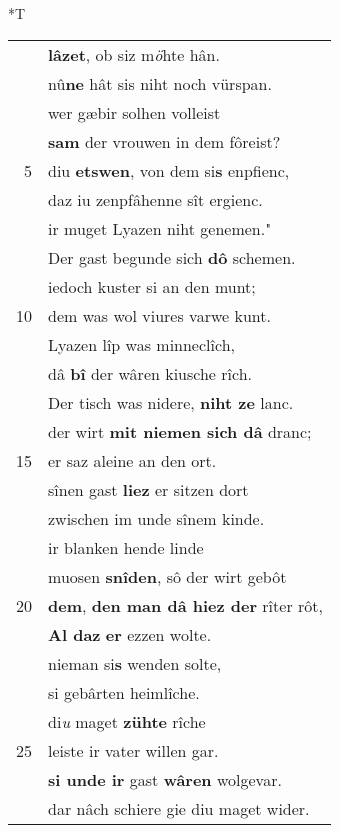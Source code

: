 \documentclass[8pt,a4paper,notitlepage]{article}
\begin{document}
\begin{table}[ht]
\begin{minipage}[t]{0.5\linewidth}
\end{minipage}
\hspace{0.5cm}
\begin{minipage}[t]{0.5\linewidth}
\small
\begin{center}*T
\end{center}
\begin{tabular}{rl}
 & \textbf{lâzet}, ob siz m\textit{ö}hte hân.\\ 
 & nû\textbf{ne} hât sis niht noch vürspan.\\ 
 & wer gæbir solhen volleist\\ 
 & \textbf{sam} der vrouwen in dem fôreist?\\ 
5 & diu  \textbf{etswen}, von dem si\textbf{s} enpfienc,\\ 
 & daz iu zenpfâhenne sît ergienc.\\ 
 & ir muget Lyazen niht genemen."\\ 
 & Der gast begunde sich \textbf{dô} schemen.\\ 
 & iedoch kuster si an den munt;\\ 
10 & dem was wol viures varwe kunt.\\ 
 & Lyazen lîp was minneclîch,\\ 
 & dâ \textbf{bî} der wâren kiusche rîch.\\ 
 & Der tisch was nidere, \textbf{niht ze} lanc.\\ 
 & der wirt \textbf{mit niemen sich dâ} dranc;\\ 
15 & er saz aleine an den ort.\\ 
 & sînen gast \textbf{liez} er sitzen dort\\ 
 & zwischen im unde sînem kinde.\\ 
 & ir blanken hende linde\\ 
 & muosen \textbf{snîden}, sô der wirt gebôt\\ 
20 & \textbf{dem}, \textbf{den man dâ hiez der} rîter rôt,\\ 
 & \textbf{Al daz} \textbf{er} ezzen wolte.\\ 
 & nieman si\textbf{s} wenden solte,\\ 
 & si gebârten heimlîche.\\ 
 & di\textit{u} maget \textbf{zühte} rîche\\ 
25 & leiste ir vater willen gar.\\ 
 & \textbf{si unde ir} gast \textbf{wâren} wolgevar.\\ 
 & dar nâch schiere gie diu maget wider.\\ 

\end{tabular}
\end{minipage}
\end{table}
\end{document}
